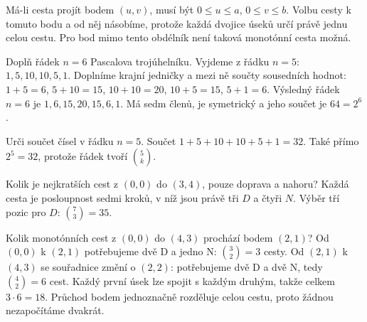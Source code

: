\documentclass[11pt,a4paper]{article}
\begin{document}
Má-li cesta projít bodem $(u,v)$, musí být $0\leq u\leq a$, $0\leq v\leq b$. Volbu cesty k tomuto bodu a od něj násobíme, protože každá dvojice úseků určí právě jednu celou cestu. Pro bod mimo tento obdélník není taková monotónní cesta možná.




\begin{prikladReseniBox}[title={Příklad P1}]
Doplň řádek \(n=6\) Pascalova trojúhelníku.
\tcblower
Vyjdeme z řádku $n=5$: $1,5,10,10,5,1$. Doplníme krajní jedničky a mezi ně součty sousedních hodnot: $1+5=6$, $5+10=15$, $10+10=20$, $10+5=15$, $5+1=6$. Výsledný řádek $n=6$ je $1,6,15,20,15,6,1$. Má sedm členů, je symetrický a jeho součet je $64=2^6$.
\end{prikladReseniBox}


\begin{prikladReseniBox}[title={Příklad P2}]
Urči součet čísel v řádku \(n=5\).
\tcblower
Součet \(1+5+10+10+5+1=32\). Také přímo \(2^5=32\), protože řádek tvoří \(\binom5k\).
\end{prikladReseniBox}


\begin{prikladReseniBox}[title={Příklad P3}]
Kolik je nejkratších cest z \((0,0)\) do \((3,4)\), pouze doprava a nahoru?
\tcblower
Každá cesta je posloupnost sedmi kroků, v níž jsou právě tři \(D\) a čtyři \(N\). Výběr tří pozic pro \(D\): \(\binom73=35\).
\end{prikladReseniBox}


\begin{prikladReseniBox}[title={Příklad P4}]
Kolik monotónních cest z $(0,0)$ do $(4,3)$ prochází bodem $(2,1)$?
\tcblower
Od $(0,0)$ k $(2,1)$ potřebujeme dvě D a jedno N: $\binom32=3$ cesty. Od $(2,1)$ k $(4,3)$ se souřadnice změní o $(2,2)$: potřebujeme dvě D a dvě N, tedy $\binom42=6$ cest. Každý první úsek lze spojit s každým druhým, takže celkem $3\cdot6=18$. Průchod bodem jednoznačně rozděluje celou cestu, proto žádnou nezapočítáme dvakrát.
\end{prikladReseniBox}
\end{document}
